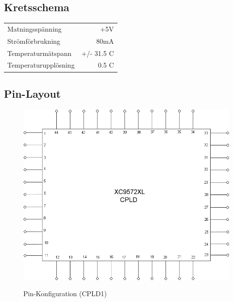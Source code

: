 \documentclass[a4paper,11pt]{article}
\begin{document}
	\subsection{Kretsschema}

		\begin{tabular}{ l r}
		   	Matningsspänning & +5V\\
		   	Strömförbrukning & ~80mA\\
		   	Temperaturmätspann & +/- 31.5 C\\
			Temperaturupplösning & 0.5 C\\	
		\end{tabular}

	\subsection{Pin-Layout}

		\begin{figure}[ht!]
		  \centering
		      \includegraphics[scale=0.48, angle=0]{PinDiagram.png}
			\label{fig:Pin1}
		  	\caption{Pin-Konfiguration (CPLD1)}
		\end{figure}
\end{document}
